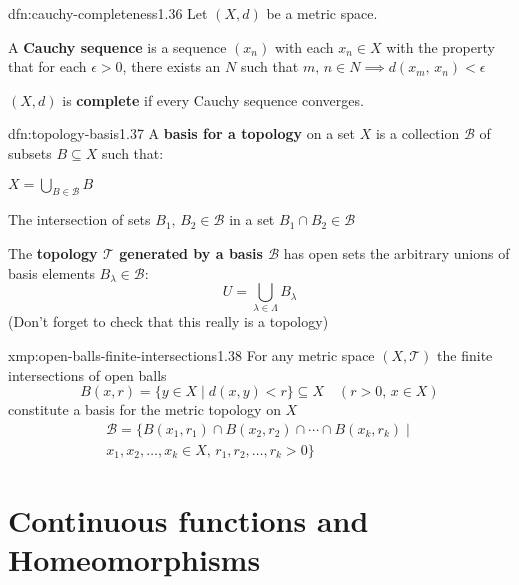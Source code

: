 \documentclass[landscape, 8pt]{extarticle}
\begin{document}
\begin{multicols}{3}
\begin{dfn}{dfn:cauchy-completeness}{1.36}
Let $(X, d)$ be a metric space.
\begin{enumerate-tight}
\item A \textbf{Cauchy sequence} is a sequence $(x_{n})$ with each $x_{n}\in X$ with the property that for each $\epsilon > 0$, there exists an $N$ such that $m,\,n\in N \implies d(x_{m},\,x_{n})< \epsilon$
\item $(X, d)$ is \textbf{complete} if every Cauchy sequence converges.
\end{enumerate-tight}
\end{dfn}

\begin{dfn}{dfn:topology-basis}{1.37}
A \textbf{basis for a topology} on a set $X$ is a collection $\mathcal{B}$ of subsets $B \subseteq X$ such that:
\begin{enumerate-tight}
\item $X = \bigcup_{B\in \mathcal{B}} B$
\item The intersection of sets $B_{1},\,B_{2}\in \mathcal{B}$ in a set $B_{1} \cap B_{2} \in \mathcal{B}$
\end{enumerate-tight}

\longrule{0.08ex}
The \textbf{topology $\mathcal{T}$ generated by a basis $\mathcal{B}$} has open sets the arbitrary unions of basis elements $B_{\lambda} \in \mathcal{B}$:
\[U = \bigcup_{\lambda\in \Lambda} B_{\lambda}\]
(Don't forget to check that this really is a topology)
\end{dfn}

\begin{xmp}{xmp:open-balls-finite-intersections}{1.38}
	For any metric space $(X, \mathcal{T})$ the finite intersections of open balls
	\[B(x,r) = \{y \in X \mid d(x, y) < r\} \subseteq X \quad (r > 0,\, x\in X)\]
	constitute a basis for the metric topology on $X$
	\begin{multline*}
		\mathcal{B} = \{B(x_{1},r_{1}) \cap B(x_{2},r_{2}) \cap \cdots \cap B(x_{k}, r_{k}) \mid \\
		x_{1},x_{2},\dots,x_{k}\in X,\,r_{1},r_{2},\dots,r_{k}>0\}
	\end{multline*}
\end{xmp}

\section{Continuous functions and Homeomorphisms}


\end{multicols}
\end{document}
